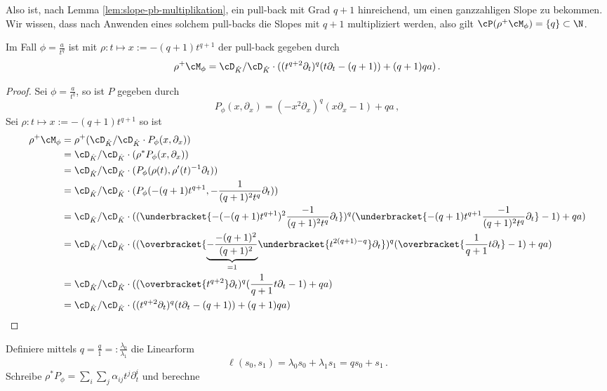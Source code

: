 \begin{comment}
\begin{cor}
Ordnung vom pull-back ist $0$
\end{cor}
\end{comment}
Also ist, nach Lemma \ref{lem:slope-pb-multiplikation}, ein pull-back mit Grad
$q+1$ hinreichend, um einen ganzzahligen Slope zu bekommen. Wir wissen, dass
nach Anwenden eines solchem pull-backs die Slopes mit ${q+1}$ multipliziert
werden, also gilt $\cP(\rho^+\cM_\phi)=\{q\}\subset\N$.
\begin{lem}
Im Fall $\phi=\frac{a}{t^{q}}$ ist mit $\rho:t\mapsto x:=-(q+1) t^{q+1}$ der
pull-back gegeben durch
\[
\rho^+\cM_\phi =\cD_{\hat K}/\cD_{\hat K} \cdot((t^{q+2}\partial_t)^{q}
    (t\partial_t-(q+1))+(q+1)qa) \,.
\]
\end{lem}
\begin{proof}
Sei $\phi=\frac{a}{t^{q}}$, so ist $P$ gegeben durch
\[
P_{\phi}(x,\partial_x) =(-x^2\partial_x)^{q} (x\partial_x-1)+qa \,,
\]
Sei $\rho:t\mapsto x:=-(q+1) t^{q+1}$ so ist
\begin{align*}
\rho^+\cM_\phi &= \rho^+(\cD_{\hat K}/\cD_{\hat K}\cdot P_\phi(x,\partial_x))\\
  &=\cD_{\hat K}/\cD_{\hat K}\cdot(\rho^*P_\phi(x,\partial_x))\\
  &=\cD_{\hat K}/\cD_{\hat K}\cdot(P_\phi(\rho(t),\rho'(t)^{-1}\partial_t))\\
  &=\cD_{\hat K}/\cD_{\hat K}
    \cdot(P_\phi(-(q+1) t^{q+1},-\frac{1}{(q+1)^2t^q}\partial_t))\\
  &=\cD_{\hat K}/\cD_{\hat K} \cdot
    ((\underbracket{-(-(q+1) t^{q+1})^2\frac{-1}{(q+1)^2t^{q}}\partial_t})^{q}
    (\underbracket{-(q+1) t^{q+1}\frac{-1}{(q+1)^2t^{q}}\partial_t}-1)+qa)\\
  &=\cD_{\hat K}/\cD_{\hat K}
    \cdot((\overbracket{
      \underset{=1}{\underbrace{-\frac{-(q+1)^2}{(q+1)^2}}}
      \underbracket{t^{2(q+1)-q}}\partial_t})^{q}
    (\overbracket{\frac{1}{q+1}t\partial_t}-1)+qa)\\
  &=\cD_{\hat K}/\cD_{\hat K}
    \cdot((\overbracket{t^{q+2}}\partial_t)^{q}
    (\frac{1}{q+1}t\partial_t-1)+qa)\\
  &=\cD_{\hat K}/\cD_{\hat K}
    \cdot((t^{q+2}\partial_t)^{q}
    (t\partial_t-(q+1))+(q+1)qa)
\end{align*}
\end{proof}
Definiere mittels
$q=\frac{q}{1}=:\frac{\lambda_0}{\lambda_1}$ die  Linearform
\[
\ell(s_0,s_1)=\lambda_0s_0+\lambda_1s_1=qs_0+s_1 \,.
\]
Schreibe $\rho^*P_{\phi}=\sum_i\sum_j\alpha_{ij}t^j\partial_t^i$ und berechne

